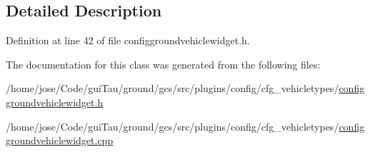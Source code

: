 \subsection{Detailed Description}


Definition at line 42 of file configgroundvehiclewidget.\-h.



The documentation for this class was generated from the following files\-:\begin{DoxyCompactItemize}
\item 
/home/jose/\-Code/gui\-Tau/ground/gcs/src/plugins/config/cfg\-\_\-vehicletypes/\hyperlink{configgroundvehiclewidget_8h}{configgroundvehiclewidget.\-h}\item 
/home/jose/\-Code/gui\-Tau/ground/gcs/src/plugins/config/cfg\-\_\-vehicletypes/\hyperlink{configgroundvehiclewidget_8cpp}{configgroundvehiclewidget.\-cpp}\end{DoxyCompactItemize}
